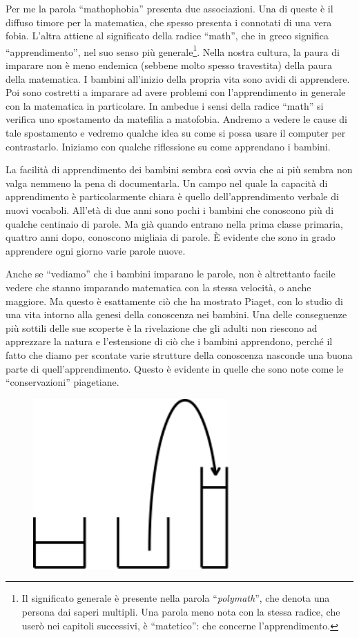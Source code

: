 Per me la parola “mathophobia” presenta due associazioni. Una di queste è il diffuso timore per la matematica, che spesso presenta i connotati di una vera fobia. L'altra attiene al significato della radice “math”, che in greco significa “apprendimento”, nel suo senso più generale\footnote{Il significato generale è presente nella parola “\textit{polymath}”, che denota una persona dai saperi multipli. Una parola meno nota con la stessa radice, che userò nei capitoli successivi, è “matetico”: che concerne l'apprendimento.}.  Nella nostra cultura, la paura di imparare non è meno endemica (sebbene molto spesso travestita) della paura della matematica. I bambini all'inizio della propria vita sono avidi di apprendere. Poi sono costretti a imparare ad avere problemi con l'apprendimento in generale con la matematica in particolare. In ambedue i sensi della radice “math” si verifica uno spostamento da matefilia a matofobia. Andremo a vedere le cause di tale spostamento e vedremo qualche idea su come si possa usare il computer per contrastarlo. Iniziamo con qualche riflessione su come apprendano i bambini.

La facilità di apprendimento dei bambini sembra così ovvia che ai più sembra non valga nemmeno la pena di documentarla. Un campo nel quale la capacità di apprendimento è particolarmente chiara è quello dell'apprendimento verbale di nuovi vocaboli. All'età di due anni sono pochi i bambini che conoscono più di qualche centinaio di parole. Ma già quando entrano nella prima classe primaria, quattro anni dopo, conoscono migliaia di parole. È evidente che sono in grado apprendere ogni giorno varie parole nuove. 

Anche se “vediamo” che i bambini imparano le parole, non è altrettanto facile vedere che stanno imparando matematica con la stessa velocità, o anche maggiore. Ma questo è esattamente ciò che ha mostrato Piaget, con lo studio di una vita intorno alla genesi della conoscenza nei bambini. Una delle conseguenze più sottili delle sue scoperte è la rivelazione che gli adulti non riescono ad apprezzare la natura e l'estensione di ciò che i bambini apprendono, perché il fatto che diamo per scontate varie strutture della conoscenza nasconde una buona parte di quell'apprendimento. Questo è evidente in quelle che sono note come le “conservazioni” piagetiane.

\begin{figure}
   \centering
   \includegraphics[width=7.5cm]{./images/papert-1/220px-Fig-2-mindstorms.png}
   \label{Papert}
\end{figure}


